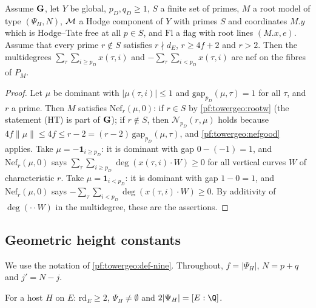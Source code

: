 \begin{lemma}\label{pf:towergeo:blocknef}
Assume $\mathbf G$, let $Y$ be global, $p_D,q_D\ge1$, $S$ a finite set of primes, $M$ a root model of type
$(\Psi_H,N)$, $\mathcal M$ a Hodge component of $Y$ with primes $S$ and coordinates $M.y$ which is Hodge--Tate free
at all $p\in S$, and $\mathrm{Fl}$ a flag with root lines $(M.x,e)$. Assume that every prime $r\notin S$ satisfies
$r\nmid d_E$, $r\ge4f+2$ and $r>2$. Then the multidegrees $\sum_\tau\sum_{i\ge p_D}x(\tau,i)$ and
$-\sum_\tau\sum_{i<p_D}x(\tau,i)$ are nef on the fibres of $P_M$.
\end{lemma}

\begin{proof}
Let $\mu$ be dominant with $|\mu(\tau,i)|\le1$ and $\mathrm{gap}_{p_D}(\mu,\tau)=1$ for all $\tau$, and $r$ a prime.
Then $M$ satisfies $\mathrm{Nef}_r(\mu,0)$: if $r\in S$ by \cref{pf:towergeo:rootw} (the statement (HT) is part of
$\mathbf G$); if $r\notin S$, then $\mathcal N_{p_D}(r,\mu)$ holds because
$4f\|\mu\|\le4f\le r-2=(r-2)\,\mathrm{gap}_{p_D}(\mu,\tau)$, and \cref{pf:towergeo:nefgood} applies. Take
$\mu=-\mathbf 1_{i\ge p_D}$: it is dominant with gap $0-(-1)=1$, and $\mathrm{Nef}_r(\mu,0)$ says
$\sum_\tau\sum_{i\ge p_D}\deg(x(\tau,i)\cdot W)\ge0$ for all vertical curves $W$ of characteristic $r$. Take
$\mu=\mathbf 1_{i<p_D}$: it is dominant with gap $1-0=1$, and $\mathrm{Nef}_r(\mu,0)$ says
$-\sum_\tau\sum_{i<p_D}\deg(x(\tau,i)\cdot W)\ge0$. By additivity of $\deg(\cdot\cdot W)$ in the multidegree, these are
the assertions.
\end{proof}

\subsection{Geometric height constants}\label{pf:towergeo:sec-nine}

We use the notation of \cref{pf:towergeo:def-nine}. Throughout, $f=|\Psi_H|$, $N=p+q$ and $j'=N-j$.

\begin{lemma}\label{pf:towergeo:host-numbers}
For a host $H$ on $E$: $\mathrm{rd}_E\ge2$, $\Psi_H\ne\emptyset$ and $2|\Psi_H|=[E:\Q]$.
\end{lemma}

